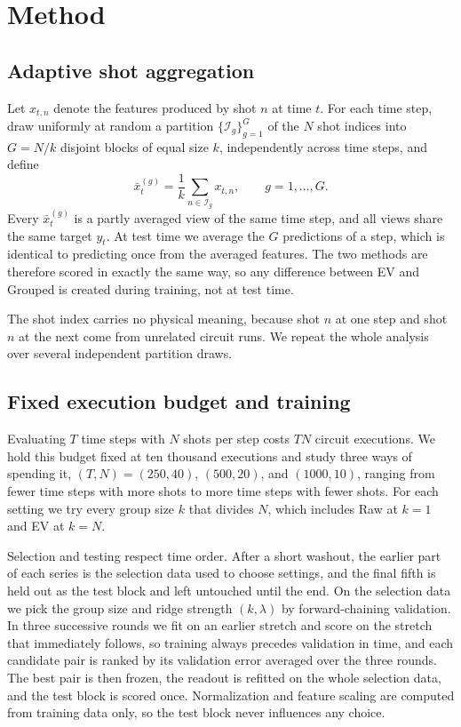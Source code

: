 \section{Method}
\label{sec:method}

\subsection{Adaptive shot aggregation}

Let $x_{t,n}$ denote the features produced by shot $n$ at time $t$. For each
time step, draw uniformly at random a partition
$\{\mathcal{I}_g\}_{g=1}^{G}$ of the $N$ shot indices into $G=N/k$ disjoint
blocks of equal size $k$, independently across time steps, and define
\begin{equation}
  \bar{x}_t^{(g)}=\frac{1}{k}\sum_{n\in\mathcal{I}_g}x_{t,n},
  \qquad g=1,\dots,G.
  \label{eq:grouping}
\end{equation}
Every $\bar{x}_t^{(g)}$ is a partly averaged view of the same time step, and all views
share the same target $y_t$. At test time we average the $G$ predictions of a
step, which is identical to predicting once from the averaged features. The two
methods are therefore scored in exactly the same way, so any difference between
EV and Grouped is created during training, not at test time.

The shot index carries no physical meaning, because shot $n$ at one step and
shot $n$ at the next come from unrelated circuit runs. We repeat the whole
analysis over several independent partition draws.

\subsection{Fixed execution budget and training}

Evaluating $T$ time steps with $N$ shots per step costs $TN$ circuit
executions. We hold this budget fixed at ten thousand executions and study
three ways of spending it, $(T,N) = (250,40)$, $(500,20)$, and $(1000,10)$,
ranging from fewer time steps with more shots to more time steps with fewer
shots. For each setting we try every group size $k$ that divides $N$, which
includes Raw at $k=1$ and EV at $k=N$.

Selection and testing respect time order. After a short washout, the earlier
part of each series is the selection data used to choose settings, and the
final fifth is held out as the test block and left untouched until the end. On
the selection data we pick the group size and ridge strength $(k,\lambda)$ by
forward-chaining validation. In three successive rounds we fit on an earlier
stretch and score on the stretch that immediately follows, so training always
precedes validation in time, and each candidate pair is ranked by its
validation error averaged over the three rounds. The best pair is then frozen,
the readout is refitted on the whole selection data, and the test block is
scored once. Normalization and feature scaling are computed from training data
only, so the test block never influences any choice.

